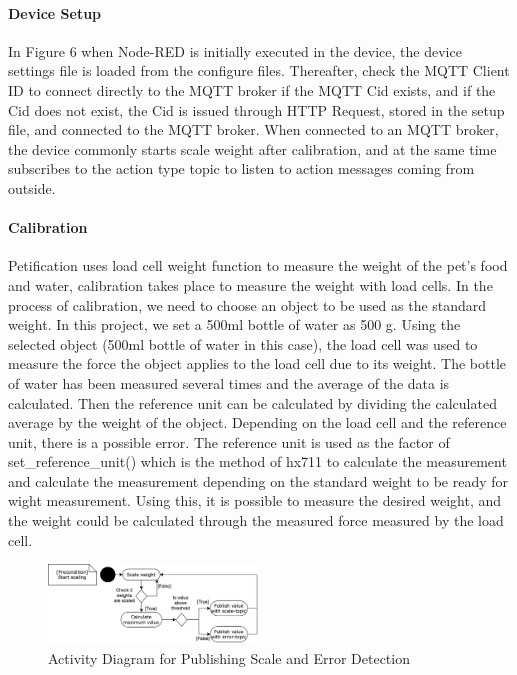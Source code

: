 \documentclass[conference]{IEEEtran}
\begin{document}
\paragraph{Device Setup}
In Figure 6 when Node-RED is initially executed in the device, the device settings file is loaded from the configure files.
Thereafter, check the MQTT Client ID to connect directly to the MQTT broker if the MQTT Cid exists, and if the Cid does not exist, the Cid is issued through HTTP Request, stored in the setup file, and connected to the MQTT broker. When connected to an MQTT broker, the device commonly starts scale weight after calibration, and at the same time subscribes to the action type topic to listen to action messages coming from outside.

\paragraph{Calibration}
Petification uses load cell weight function to measure the weight of the pet’s food and water,
calibration takes place to measure the weight with load cells.
In the process of calibration, we need to choose an object to be used as the standard weight. In this project, we set a 500ml bottle of water as 500 g.
Using the selected object (500ml bottle of water in this case), the load cell was used to measure
the force the object applies to the load cell due to its weight.
The bottle of water has been measured several times and the average of the data is calculated.
Then the reference unit can be calculated by dividing the calculated average by the weight of the
object.
Depending on the load cell and the reference unit, there is a possible error.
The reference unit is used as the factor of set\_reference\_unit() which is the method of hx711 to
calculate the measurement and calculate the measurement depending on the standard weight to
be ready for wight measurement. Using this, it is possible to measure the desired weight, and the
weight could be calculated through the measured force measured by the load cell.

\begin{figure}[htbp]
\centerline{\includegraphics[width=0.5\textwidth]{./images/publishScaleError.png}}
\caption{Activity Diagram for Publishing Scale and Error Detection}
\label{fig}
\end{figure}
\end{document}
